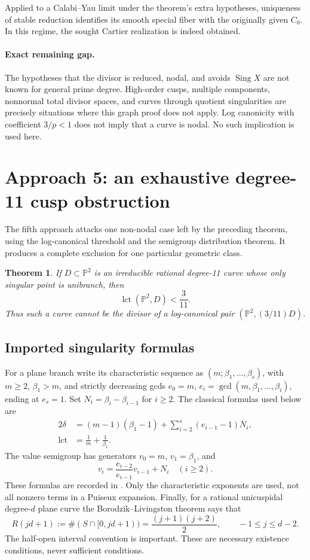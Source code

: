 \documentclass[11pt]{article}
\newtheorem{theorem}{Theorem}[section]
\theoremstyle{remark}\newtheorem{remark}[theorem]{Remark}
\newcommand{\PP}{\mathbb P}\newcommand{\CC}{\mathbb C}\newcommand{\ZZ}{\mathbb Z}
\newcommand{\lct}{\operatorname{lct}}\newcommand{\Sing}{\operatorname{Sing}}
\begin{document}
Applied to a Calabi--Yau limit under the theorem's extra hypotheses, uniqueness of stable reduction identifies its smooth special fiber with the originally given $C_0$. In this regime, the sought Cartier realization is indeed obtained.

\paragraph{Exact remaining gap.}
The hypotheses that the divisor is reduced, nodal, and avoids $\Sing X$ are not known for general prime degree. High-order cusps, multiple components, nonnormal total divisor spaces, and curves through quotient singularities are precisely situations where this graph proof does not apply. Log canonicity with coefficient $3/p<1$ does not imply that a curve is nodal. No such implication is used here.

\section{Approach 5: an exhaustive degree-11 cusp obstruction}
The fifth approach attacks one non-nodal case left by the preceding theorem, using the log-canonical threshold and the semigroup distribution theorem. It produces a complete exclusion for one particular geometric class.

\begin{theorem}\label{thm:11}
If $D\subset\PP^2$ is an irreducible rational degree-11 curve whose only singular point is unibranch, then
\[
 \lct(\PP^2,D)<\frac3{11}.
\]
Thus such a curve cannot be the divisor of a log-canonical pair $(\PP^2,(3/11)D)$.
\end{theorem}
\subsection{Imported singularity formulas}
For a plane branch write its characteristic sequence as $(m;\beta_1,\ldots,\beta_s)$, with $m\geq2$, $\beta_1>m$, and strictly decreasing gcds $e_0=m$, $e_i=\gcd(m,\beta_1,\ldots,\beta_i)$, ending at $e_s=1$. Set $N_i=\beta_i-\beta_{i-1}$ for $i\geq2$. The classical formulas used below are
\begin{align}
 2\delta&=(m-1)(\beta_1-1)+\sum_{i=2}^s(e_{i-1}-1)N_i,\label{eq:delta}\\
 \lct&=\frac1m+\frac1{\beta_1}.\label{eq:lct}
\end{align}
The value semigroup has generators $v_0=m$, $v_1=\beta_1$, and
\[
 v_i=\frac{e_{i-2}}{e_{i-1}}v_{i-1}+N_i\quad(i\geq2).
\]
These formulas are recorded in \cite[\S2,\S3.5]{DSi}. Only the characteristic exponents are used, not all nonzero terms in a Puiseux expansion. Finally, for a rational unicuspidal degree-$d$ plane curve the Borodzik--Livingston theorem \cite[Thm.~6.5]{BL} says that
\begin{equation}\label{eq:BL}
 R(jd+1):=\#(S\cap[0,jd+1))=\frac{(j+1)(j+2)}2,
 \qquad -1\leq j\leq d-2.
\end{equation}
The half-open interval convention is important. These are necessary existence conditions, never sufficient conditions.
\end{document}
